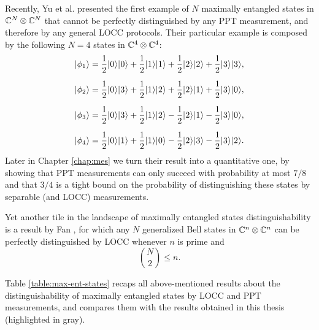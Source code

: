 Recently, Yu et al. \cite{Yu12} presented the first example of $N$ maximally 
entangled states in $\mathbb{C}^{N}\otimes\mathbb{C}^{N}$ that cannot be 
perfectly distinguished by any PPT measurement, and therefore by any general 
LOCC protocols.
Their particular example is composed by the following $N = 4$ states in 
$\mathbb{C}^{4}\otimes\mathbb{C}^{4}$:
\begin{equation}
  \label{eq:ydy_states}
  \begin{aligned}
    \ket{\phi_1} & =
    \frac{1}{2} \ket{0}\ket{0} + 
    \frac{1}{2} \ket{1}\ket{1} + 
    \frac{1}{2} \ket{2}\ket{2} + 
    \frac{1}{2} \ket{3}\ket{3}, \\[2mm]
    \ket{\phi_2} & =
    \frac{1}{2} \ket{0}\ket{3} + 
    \frac{1}{2} \ket{1}\ket{2} + 
    \frac{1}{2} \ket{2}\ket{1} + 
    \frac{1}{2} \ket{3}\ket{0}, \\[2mm]
    \ket{\phi_3} & =
    \frac{1}{2} \ket{0}\ket{3} +
    \frac{1}{2} \ket{1}\ket{2} - 
    \frac{1}{2} \ket{2}\ket{1} - 
    \frac{1}{2} \ket{3}\ket{0}, \\[2mm]
    \ket{\phi_4} & =
    \frac{1}{2} \ket{0}\ket{1} + 
    \frac{1}{2} \ket{1}\ket{0} -
    \frac{1}{2} \ket{2}\ket{3} - 
    \frac{1}{2} \ket{3}\ket{2}.
  \end{aligned}
\end{equation}
Later in Chapter \ref{chap:mes} we turn their result into a quantitative one,
by showing that PPT measurements can only succeed with probability at most $7/8$
and that $3/4$ is a tight bound on the probability of distinguishing these states 
by separable (and LOCC) measurements.

Yet another tile in the landscape of maximally entangled states distinguishability
is a result by Fan \cite{Fan04}, for which any $N$ generalized 
Bell states in $\mathbb{C}^{n}\otimes\mathbb{C}^{n}$ can be perfectly distinguished 
by LOCC whenever $n$ is prime and 
\[ 
  \binom{N}{2}\leq n.
\]

Table \ref{table:max-ent-states} recaps all above-mentioned results about the
distinguishability of maximally entangled states by LOCC and PPT 
measurements, and compares them with the results obtained in this thesis 
(highlighted in gray). 

